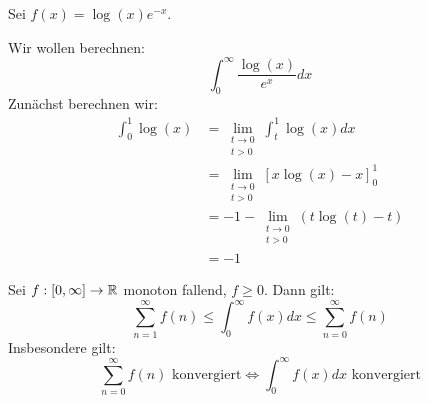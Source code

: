\documentclass[main.tex]{subfiles}
\begin{document}
\begin{Beispiel}
  Sei $f(x) = \log(x)e^{-x}$.\\
  \begin{center}
  \end{center}

  Wir wollen berechnen:
  $$\int_0^\infty \dfrac{\log(x)}{e^x}dx$$
  Zunächst berechnen wir:
  $$\begin{aligned}
    \int_0^1 \log(x)&= \lim \limits_{\substack{t \to 0 \\ t > 0}} \int_t^1 \log(x)dx\\
    &= \lim \limits_{\substack{t \to 0 \\ t > 0}} [ x \log(x) -x]_0^1\\
    &= -1 - \lim \limits_{\substack{t \to 0 \\ t > 0}} (t \log(t) -t)\\
    &= -1
  \end{aligned}$$
\end{Beispiel}

\begin{Theorem}
  Sei $f:[0,\infty] \to \mathbb{R}$ monoton fallend, $f \geq 0$. Dann gilt:
  $$\sum \limits_{n=1}^\infty f(n) \leq \int_0^\infty f(x)dx \leq \sum \limits_{n=0}^\infty f(n)$$
  Insbesondere gilt:
  $$\sum \limits_{n=0}^\infty f(n) \text{ konvergiert} \Leftrightarrow \int_0^\infty f(x)dx \text{ konvergiert}$$
\end{Theorem}
\end{document}
